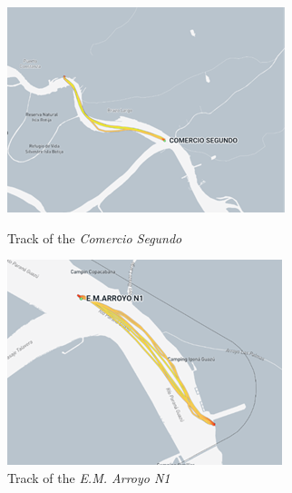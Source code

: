 \begin{figure}[h!]
    \centering
    \begin{minipage}{0.48\textwidth}
        \centering
        \includegraphics[width=\linewidth]{figures/ch5/Track_CS.png}
        \caption{Track of the \textit{Comercio Segundo}}
        \label{fig:track_cs}
    \end{minipage}\hfill
    \begin{minipage}{0.48\textwidth}
        \centering
        \includegraphics[width=\linewidth]{figures/ch5/Track_EM.png}
        \caption{Track of the \textit{E.M. Arroyo N1}}
        \label{fig:track_em}
    \end{minipage}
\end{figure}

